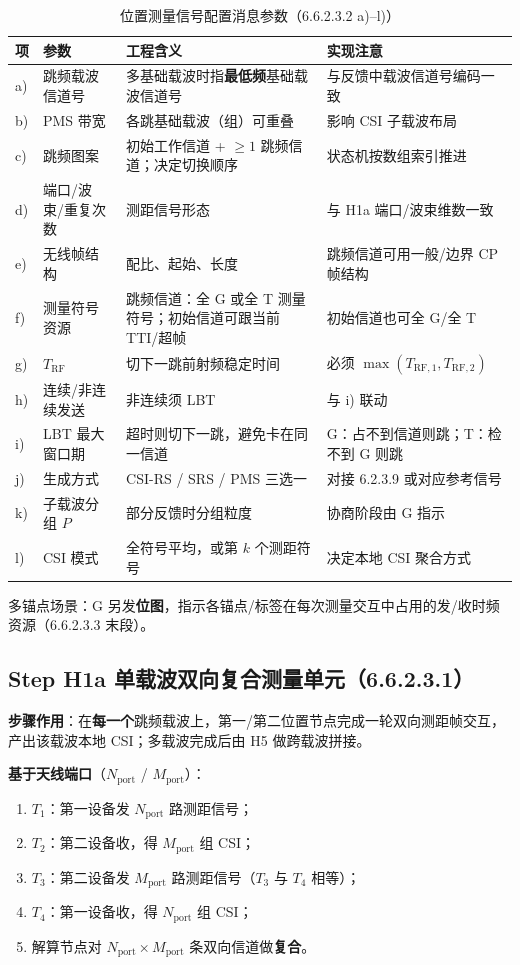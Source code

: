 \documentclass[11pt,a4paper]{ctexart}
\begin{document}
\begin{table}[h]
\centering
\small
\caption{位置测量信号配置消息参数（6.6.2.3.2 a)--l)）}
\begin{tabular}{L{0.8cm}L{3.2cm}L{4.5cm}L{4cm}}
\toprule
\textbf{项} & \textbf{参数} & \textbf{工程含义} & \textbf{实现注意} \\
\midrule
a) & 跳频载波信道号 & 多基础载波时指\textbf{最低频}基础载波信道号 & 与反馈中载波信道号编码一致 \\
b) & PMS 带宽 & 各跳基础载波（组）可重叠 & 影响 CSI 子载波布局 \\
c) & 跳频图案 & 初始工作信道 + $\ge 1$ 跳频信道；决定切换顺序 & 状态机按数组索引推进 \\
d) & 端口/波束/重复次数 & 测距信号形态 & 与 H1a 端口/波束维数一致 \\
e) & 无线帧结构 & 配比、起始、长度 & 跳频信道可用一般/边界 CP 帧结构 \\
f) & 测量符号资源 & 跳频信道：全 G 或全 T 测量符号；初始信道可跟当前 TTI/超帧 & 初始信道也可全 G/全 T \\
g) & $T_{\mathrm{RF}}$ & 切下一跳前射频稳定时间 & 必须 $\max(T_{\mathrm{RF},1},T_{\mathrm{RF},2})$ \\
h) & 连续/非连续发送 & 非连续须 LBT & 与 i) 联动 \\
i) & LBT 最大窗口期 & 超时则切下一跳，避免卡在同一信道 & G：占不到信道则跳；T：检不到 G 则跳 \\
j) & 生成方式 & CSI-RS / SRS / PMS 三选一 & 对接 6.2.3.9 或对应参考信号 \\
k) & 子载波分组 $P$ & 部分反馈时分组粒度 & 协商阶段由 G 指示 \\
l) & CSI 模式 & 全符号平均，或第 $k$ 个测距符号 & 决定本地 CSI 聚合方式 \\
\bottomrule
\end{tabular}
\end{table}

多锚点场景：G 另发\textbf{位图}，指示各锚点/标签在每次测量交互中占用的发/收时频资源（6.6.2.3.3 末段）。

\subsection{Step H1a 单载波双向复合测量单元（6.6.2.3.1）}

\textbf{步骤作用}：在\textbf{每一个}跳频载波上，第一/第二位置节点完成一轮双向测距帧交互，产出该载波本地 CSI；多载波完成后由 H5 做跨载波拼接。

\textbf{基于天线端口}（$N_{\mathrm{port}}$ / $M_{\mathrm{port}}$）：
\begin{enumerate}[nosep]
  \item $T_1$：第一设备发 $N_{\mathrm{port}}$ 路测距信号；
  \item $T_2$：第二设备收，得 $M_{\mathrm{port}}$ 组 CSI；
  \item $T_3$：第二设备发 $M_{\mathrm{port}}$ 路测距信号（$T_3$ 与 $T_4$ 相等）；
  \item $T_4$：第一设备收，得 $N_{\mathrm{port}}$ 组 CSI；
  \item 解算节点对 $N_{\mathrm{port}}\times M_{\mathrm{port}}$ 条双向信道做\textbf{复合}。
\end{enumerate}
\end{document}
